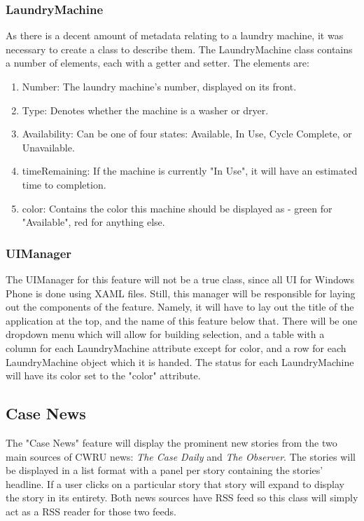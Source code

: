 \documentclass[pdftex,12pt,letter]{article}
\begin{document}
\subsubsection{LaundryMachine}
As there is a decent amount of metadata relating to a laundry machine, it was necessary to create a class to describe them. The LaundryMachine class contains a number of elements, each with a getter and setter. The elements are:
\begin{enumerate}
\item Number: The laundry machine's number, displayed on its front.
\item Type: Denotes whether the machine is a washer or dryer.
\item Availability: Can be one of four states: Available, In Use, Cycle Complete, or Unavailable.
\item timeRemaining: If the machine is currently "In Use", it will have an estimated time to completion.
\item color: Contains the color this machine should be displayed as - green for "Available", red for anything else.
\end{enumerate}
\subsubsection{UIManager}
The UIManager for this feature will not be a true class, since all UI for Windows Phone is done using XAML files. Still, this manager will be responsible for laying out the components of the feature. Namely, it will have to lay out the title of the application at the top, and the name of this feature below that. There will be one dropdown menu which will allow for building selection, and a table with a column for each LaundryMachine attribute except for color, and a row for each LaundryMachine object which it is handed. The status for each LaundryMachine will have its color set to the "color" attribute.
\subsection{Case News}
The "Case News" feature will display the prominent new stories from the
two main sources of CWRU news: \emph{The Case Daily} and \emph{The Observer}. The
stories will be displayed in a list format with a panel per story containing the
stories' headline. If a user clicks on a particular story that story will expand
to display the story in its entirety. Both news sources have RSS feed so this
class will simply act as a RSS reader for those two feeds.
\end{document}
